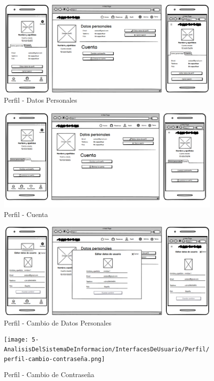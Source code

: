 \begin{figure}[H]
	\centering
	\includegraphics[width=0.8\linewidth]{5-AnalisisDelSistemaDeInformacion/InterfacesDeUsuario/Perfil/perfil-personales.png}
	\caption{Perfil - Datos Personales}
\end{figure}

\begin{figure}[H]
	\centering
	\includegraphics[width=0.8\linewidth]{5-AnalisisDelSistemaDeInformacion/InterfacesDeUsuario/Perfil/perfil-cuenta.png}
	\caption{Perfil - Cuenta}
\end{figure}

\begin{figure}[H]
	\centering
	\includegraphics[width=0.8\linewidth]{5-AnalisisDelSistemaDeInformacion/InterfacesDeUsuario/Perfil/perfil-cambio-personales.png}
	\caption{Perfil - Cambio de Datos Personales}
\end{figure}

\begin{figure}[H]
	\centering
	\texttt{[image: 5-AnalisisDelSistemaDeInformacion/InterfacesDeUsuario/Perfil/perfil-cambio-contraseña.png]}
	\caption{Perfil - Cambio de Contraseña}
\end{figure}